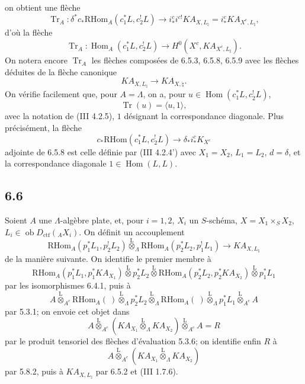\documentclass[11pt]{article}
\DeclareMathOperator{\Hom}{Hom}
\providecommand{\RHom}{\mathrm{RHom}}
\providecommand{\Tr}{\operatorname{Tr}}
\providecommand{\Tr}{\operatorname{Tr}}
\providecommand{\lten}{\overset{\mathrm L}{\otimes}}
\providecommand{\Ob}{\operatorname{ob}}
\providecommand{\Tr}{\operatorname{Tr}}
\providecommand{\RHom}{\mathrm{RHom}}
\providecommand{\Hom}{\operatorname{Hom}}
\providecommand{\lten}{\overset{\mathrm L}{\otimes}}
\providecommand{\RHom}{\mathrm R\mathcal{H}om}
\providecommand{\lten}{\overset{\mathrm L}{\otimes}}
\providecommand{\Ob}{\operatorname{ob}}
\providecommand{\Tr}{\operatorname{Tr}}
\providecommand{\lten}{\overset{\mathrm L}{\otimes}}
\providecommand{\lten}{\overset{\mathrm L}{\otimes}}
\providecommand{\Ob}{\operatorname{Ob}}
\providecommand{\lten}{\overset{\mathrm L}{\otimes}}
\providecommand{\RHom}{\mathrm{RHom}}
\providecommand{\Hom}{\operatorname{Hom}}
\providecommand{\Tr}{\operatorname{Tr}}
\providecommand{\Ob}{\operatorname{ob}}
\providecommand{\Ob}{\operatorname{Ob}}
\providecommand{\lten}{\overset{\mathrm L}{\otimes}}
\begin{document}
on obtient une flèche
\begin{equation}
\Tr_A:\delta^*c_*\RHom_A(c_1^*L,c_2^!L)
\longrightarrow
i_*^ci^{c!}KA_{X,L_{\natural}}
=i_*^cKA_{X^c,L_{\natural}},
\tag{6.5.8}
\end{equation}
d'où la flèche
\begin{equation}
\Tr_A:\Hom_A(c_1^*L,c_2^!L)
\longrightarrow
H^0(X^c,KA_{X^c,L_{\natural}}).
\tag{6.5.9}
\end{equation}
On notera encore $\Tr_A$ les flèches composées de 6.5.3, 6.5.8, 6.5.9 avec les flèches déduites de la flèche canonique
\[
KA_{X,L_{\natural}}\longrightarrow KA_{X,\natural}.
\]
On vérifie facilement que, pour $A=\Lambda$, on a, pour $u\in\Hom(c_1^*L,c_2^!L)$,
\begin{equation}
\Tr(u)=\langle u,1\rangle,
\tag{6.5.10}
\end{equation}
avec la notation de (III 4.2.5), $1$ désignant la correspondance diagonale. Plus précisément, la flèche
\[
c_*\RHom(c_1^*L,c_2^!L)\longrightarrow \delta_*i_*^cK_{X^c}
\]
adjointe de 6.5.8 est celle définie par (III 4.2.4') avec $X_1=X_2$, $L_1=L_2$, $d=\delta$, et la correspondance diagonale $1\in\Hom(L,L)$.

\subsection*{6.6}
Soient $A$ une $\Lambda$-algèbre plate, et, pour $i=1,2$, $X_i$ un $S$-schéma, $X=X_1\times_SX_2$, $L_i\in\Ob D_{\mathrm{ctf}}({}_AX_i)$. On définit un accouplement
\begin{equation}
\RHom_A(p_1^*L_1,p_2^!L_2)
\lten_{\Lambda}
\RHom_A(p_2^*L_2,p_1^!L_1)
\longrightarrow
KA_{X,L_{\natural}}
\tag{6.6.1}
\end{equation}
de la manière suivante. On identifie le premier membre à
\[
\RHom_A(p_1^*L_1,p_1^*KA_{X_1})
\lten p_2^*L_2
\lten
\RHom_A(p_2^*L_2,p_2^*KA_{X_2})
\lten p_1^*L_1
\]
par les isomorphismes 6.4.1, puis à
\[
A\lten_{A^e}\RHom_A(\ )\lten_{\Lambda}p_2^*L_2
 \lten_{\Lambda}\RHom_A(\ )\lten_{\Lambda}p_1^*L_1\lten_{A^e}A
\]
par 5.3.1; on envoie cet objet dans
\[
A\lten_{A^e}(KA_{X_1}\lten_{\Lambda}KA_{X_2})\lten_{A^e}A=R
\]
par le produit tensoriel des flèches d'évaluation 5.3.6; on identifie enfin $R$ à
\[
A\lten_{A^e}(KA_{X_1}\lten_{\Lambda}KA_{X_2})
\]
par 5.8.2, puis à $KA_{X,L_{\natural}}$ par 6.5.2 et (III 1.7.6).
\end{document}
